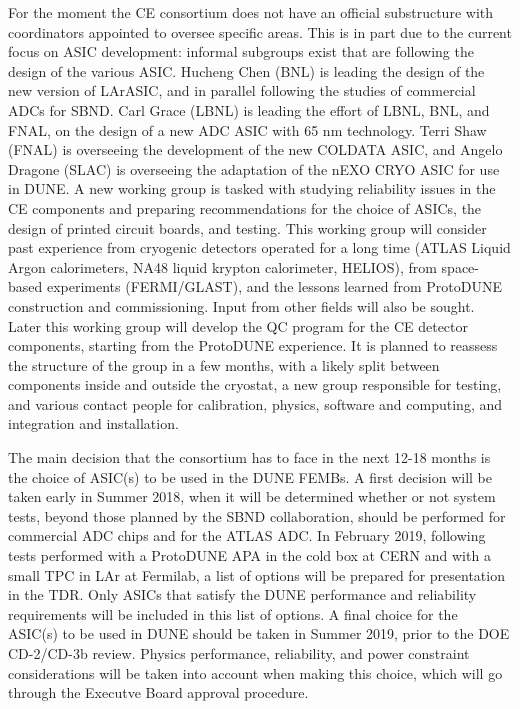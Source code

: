 For the moment the CE consortium does not have an official substructure
with coordinators appointed to oversee specific areas. This is in part due
to the current focus on ASIC development: informal subgroups exist that
are following the design of the various ASIC. Hucheng Chen (BNL) is leading the
design of the new version of LArASIC, and in parallel following the studies
of commercial ADCs for SBND. Carl Grace (LBNL) is leading the effort of
LBNL, BNL, and FNAL, on the design of a new ADC ASIC with 65 nm technology.
Terri Shaw (FNAL) is overseeing the development of the new COLDATA ASIC, and
Angelo Dragone (SLAC) is overseeing the adaptation of the nEXO CRYO ASIC
for use in DUNE. A new working group is tasked with studying reliability
issues in the CE components and preparing recommendations for the choice
of ASICs, the design of printed circuit boards, and testing. This working group
will consider past experience from cryogenic detectors operated for a long
time (ATLAS Liquid Argon calorimeters, NA48 liquid krypton calorimeter, HELIOS),
from space-based experiments (FERMI/GLAST), and the lessons learned from
ProtoDUNE construction and commissioning. Input from other fields will
also be sought. Later this working group will develop the QC program for the CE detector
components, starting from the ProtoDUNE experience. It is planned to
reassess the structure of the group in a few months, with a likely split
between components inside and outside the cryostat, a new group responsible
for testing, and various contact people for calibration, physics, software and
computing, and integration and installation.
 
The main decision that the consortium has to face in the next 12-18 months
is the choice of ASIC(s) to be used in the DUNE FEMBs. A first decision will
be taken early in Summer 2018, when it will be determined whether or not system
tests, beyond those planned by the SBND collaboration, should be performed for 
commercial ADC chips and for the ATLAS ADC. In February 2019, following tests
performed with a ProtoDUNE APA in the cold box at CERN and with a small TPC in
LAr at Fermilab, a list of options will be prepared for presentation in the TDR.
Only ASICs that satisfy the DUNE performance and reliability requirements
will be included in this list of options. A final choice for the ASIC(s) to
be used in DUNE should be taken in Summer 2019, prior to the DOE CD-2/CD-3b
review. Physics performance, reliability, and power constraint considerations
will be taken into account when making this choice, which will go through
the Executve Board approval procedure.
